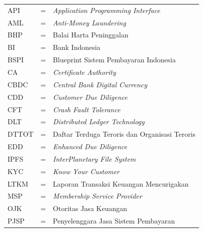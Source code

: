 \begin{tabular}{llp{9cm}}
API   & \hspace{1cm} = & \textit{Application Programming Interface} \\
AML   & \hspace{1cm} = & \textit{Anti-Money Laundering} \\
BHP   & \hspace{1cm} = & Balai Harta Peninggalan \\
BI    & \hspace{1cm} = & Bank Indonesia \\
BSPI  & \hspace{1cm} = & Blueprint Sistem Pembayaran Indonesia \\
CA    & \hspace{1cm} = & \textit{Certificate Authority} \\
CBDC  & \hspace{1cm} = & \textit{Central Bank Digital Currency} \\
CDD   & \hspace{1cm} = & \textit{Customer Due Diligence} \\
CFT   & \hspace{1cm} = & \textit{Crash Fault Tolerance} \\
DLT   & \hspace{1cm} = & \textit{Distributed Ledger Technology} \\
DTTOT & \hspace{1cm} = & Daftar Terduga Teroris dan Organisasi Teroris \\
EDD   & \hspace{1cm} = & \textit{Enhanced Due Diligence} \\
IPFS  & \hspace{1cm} = & \textit{InterPlanetary File System} \\
KYC   & \hspace{1cm} = & \textit{Know Your Customer} \\
LTKM  & \hspace{1cm} = & Laporan Transaksi Keuangan Mencurigakan \\
MSP   & \hspace{1cm} = & \textit{Membership Service Provider} \\
OJK   & \hspace{1cm} = & Otoritas Jasa Keuangan \\
PJSP  & \hspace{1cm} = & Penyelenggara Jasa Sistem Pembayaran \\

\end{tabular}
